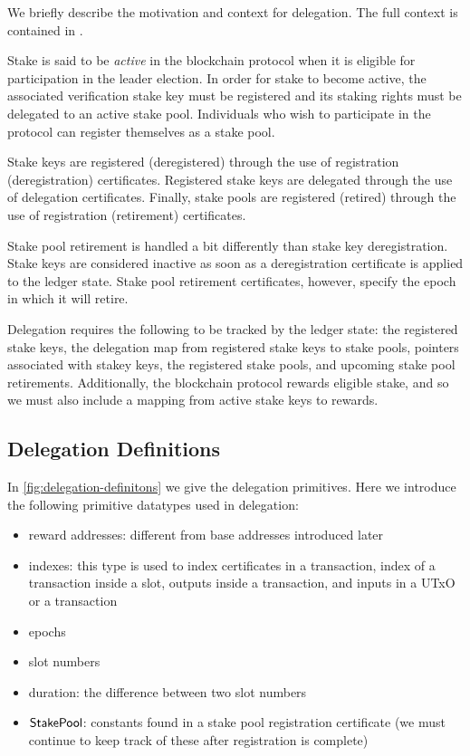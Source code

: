
We briefly describe the motivation and context for delegation.
The full context is contained in \cite{delegation_design}.

Stake is said to be \textit{active} in the blockchain protocol
when it is eligible for participation in the leader election. In order for
stake to become active,
the associated verification stake key must be registered
and its staking rights must be delegated to an active stake pool.
Individuals who wish to participate in the protocol can
register themselves as a stake pool.

Stake keys are registered (deregistered) through the use of
registration (deregistration) certificates.
Registered stake keys are delegated through the use of delegation certificates.
Finally, stake pools are registered (retired) through the use of
registration (retirement) certificates.

Stake pool retirement is handled a bit differently than stake key deregistration.
Stake keys are considered inactive as soon as a deregistration certificate
is applied to the ledger state.
Stake pool retirement certificates, however, specify the epoch in
which it will retire.

Delegation requires the following to be tracked by the ledger state:
the registered stake keys, the delegation map from registered stake keys to stake
pools, pointers associated with stakey keys,
the registered stake pools, and upcoming stake pool retirements.
Additionally, the blockchain protocol rewards eligible stake, and so we must
also include a mapping from active stake keys to rewards.

\subsection{Delegation Definitions}
\label{sec:deleg-defs}

In \cref{fig:delegation-definitons} we give the delegation primitives.
Here we introduce the following primitive datatypes used in delegation:

\begin{itemize}
\item reward addresses: different from base addresses introduced later
\item indexes: this type is used to index certificates in a transaction,
index of a transaction inside a slot, outputs inside a transaction,
and inputs in a UTxO or a transaction
\item epochs
\item slot numbers
\item duration: the difference between two slot numbers
\item $\mathsf{StakePool}$: constants found in a stake pool registration certificate
(we must continue to keep track of these after registration is complete)
\end{itemize}

